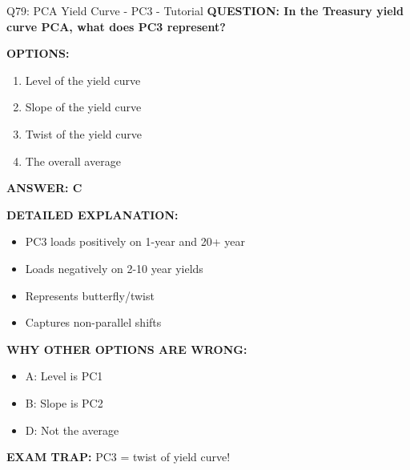 \documentclass[8pt]{beamer}
\begin{document}
	\begin{frame}{Q79: PCA Yield Curve - PC3 - Tutorial}
		\fontsize{6.5}{7.5}\selectfont
		\textbf{QUESTION: In the Treasury yield curve PCA, what does PC3 represent?}
		
		\vspace{0.1cm}
		\textbf{OPTIONS:}
		\begin{enumerate}
			\item Level of the yield curve
			\item Slope of the yield curve
			\item Twist of the yield curve
			\item The overall average
		\end{enumerate}
		
		\vspace{0.1cm}
		\textcolor{myblue}{\textbf{ANSWER: C}}
		
		\vspace{0.1cm}
		\textbf{DETAILED EXPLANATION:}
		\begin{itemize}
			\item PC3 loads positively on 1-year and 20+ year
			\item Loads negatively on 2-10 year yields
			\item Represents butterfly/twist
			\item Captures non-parallel shifts
		\end{itemize}
		
		\vspace{0.1cm}
		\textcolor{myred}{\textbf{WHY OTHER OPTIONS ARE WRONG:}}
		\begin{itemize}
			\item \textcolor{myred}{A:} Level is PC1
			\item \textcolor{myred}{B:} Slope is PC2
			\item \textcolor{myred}{D:} Not the average
		\end{itemize}
		
		\textcolor{myred}{\textbf{EXAM TRAP:}} PC3 = \textcolor{myblue}{twist of yield curve}!
	\end{frame}
	
\end{document}
